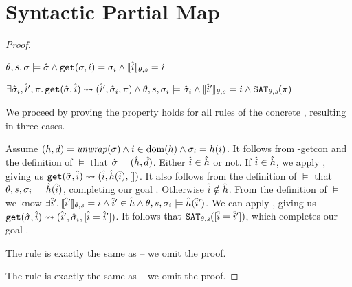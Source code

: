 \section{Syntactic Partial Map} \label{proofs:syntpmap-soundness}

\begin{proof}


\pfassume \begin{hypvlist}
 $\theta,s,\sigma \models \hat{\sigma} \land \texttt{get}(\sigma, i)=\sigma_i \land \llbracket\hat{i}\rrbracket_{\theta,s}=i$
\end{hypvlist}
\pfprove \begin{goalvlist}
 $\exists \hat{\sigma}_i, \hat{i}', \pi \ldotp \texttt{get}(\hat{\sigma},\hat{i})\rightsquigarrow(\hat{i}', \hat{\sigma}_i, \pi) \land \theta,s,\sigma_i\models\hat{\sigma}_i \land \llbracket\hat{i}'\rrbracket_{\theta,s}=i \land \texttt{SAT}_{\mathit{\theta,s}}(\pi)$
\end{goalvlist}

We proceed by proving the property holds for all rules of the concrete , resulting in three cases.


\begin{hypvlist}
 Assume $(h,d)={\operatorname{\mathit{unwrap}}}(\sigma) \land i\in\operatorname{dom}(h) \land \sigma_{i}=h(i)$.
 It follows from \hyp{getcon} and the definition of $\models$ that $\hat{\sigma}=(\hat{h}, \hat{d})$.
 Either $\hat{i}\in\hat{h}$ or not. If $\hat{i}\in \hat{h}$, we apply , giving us $\texttt{get}(\hat{\sigma},\hat{i})\rightsquigarrow(\hat{i}, \hat{h}(\hat{i}), [])$. It also follows from the definition of $\models$ that ${\theta,s,\sigma_i\models\hat{h}(\hat{i})}$, completing our goal .
 Otherwise $\hat{i}\notin \hat{h}$. From the definition of $\models$ we know $\exists \hat{i}'\ldotp \llbracket\hat{i}'\rrbracket_{\theta,s}=i\land \hat{i}'\in\hat{h} \land {\theta,s,\sigma_i\models \hat{h}(\hat{i}')}$. We can apply , giving us $\texttt{get}(\hat{\sigma},\hat{i})\rightsquigarrow(\hat{i}',\hat{\sigma}_i, [\hat{i}=\hat{i}'])$. It follows that $\texttt{SAT}_{\mathit{\theta,s}}([\hat{i} = \hat{i}'])$, which completes our goal .
\end{hypvlist}

The rule  is exactly the same as  -- we omit the proof.

The rule  is exactly the same as  -- we omit the proof.


\end{proof}
